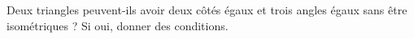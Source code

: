 Deux triangles peuvent-ils avoir deux côtés égaux et trois angles égaux sans être isométriques ? Si oui, donner des conditions.
